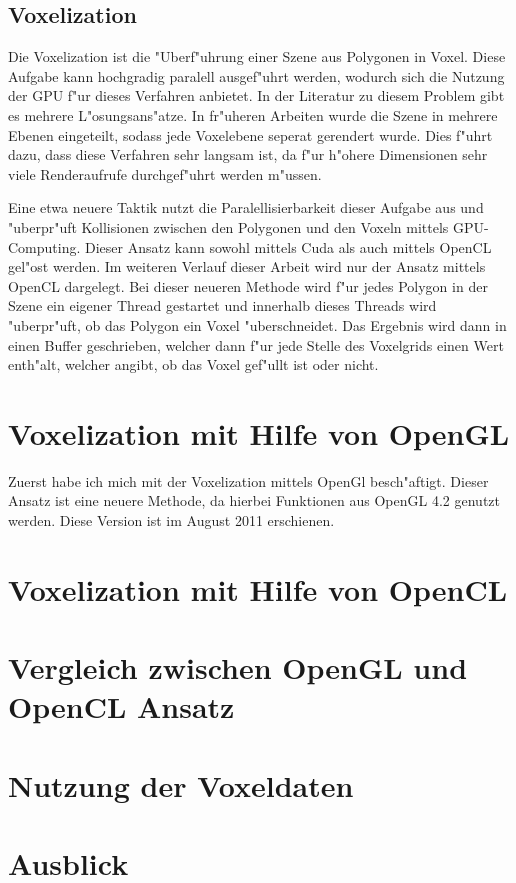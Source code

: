 \documentclass[a4paper, 12pt]{scrartcl}
\begin{document}
\subsection{Voxelization}
Die Voxelization ist die "Uberf"uhrung einer Szene aus Polygonen in Voxel. Diese Aufgabe kann hochgradig paralell ausgef"uhrt werden, wodurch sich die Nutzung der GPU f"ur dieses Verfahren anbietet. In der Literatur zu diesem Problem gibt es mehrere L"osungsans"atze. In fr"uheren Arbeiten wurde die Szene in mehrere Ebenen eingeteilt, sodass jede Voxelebene seperat gerendert wurde. Dies f"uhrt dazu, dass diese Verfahren sehr langsam ist, da f"ur h"ohere Dimensionen sehr viele Renderaufrufe durchgef"uhrt werden m"ussen.

Eine etwa neuere Taktik nutzt die Paralellisierbarkeit dieser Aufgabe aus und "uberpr"uft Kollisionen zwischen den Polygonen und den Voxeln mittels GPU-Computing. Dieser Ansatz kann sowohl mittels Cuda als auch mittels OpenCL gel"ost werden. Im weiteren Verlauf dieser Arbeit wird nur der Ansatz mittels OpenCL dargelegt.
Bei dieser neueren Methode wird f"ur jedes Polygon in der Szene ein eigener Thread gestartet und innerhalb dieses Threads wird "uberpr"uft, ob das Polygon ein Voxel "uberschneidet. Das Ergebnis wird dann in einen Buffer geschrieben, welcher dann f"ur jede Stelle des Voxelgrids einen Wert enth"alt, welcher angibt, ob das Voxel gef"ullt ist oder nicht.

\section{Voxelization mit Hilfe von OpenGL}
Zuerst habe ich mich mit der Voxelization mittels OpenGl besch"aftigt. Dieser Ansatz ist eine neuere Methode, da hierbei Funktionen aus OpenGL 4.2 genutzt werden. Diese Version ist im August 2011 erschienen.



\section{Voxelization mit Hilfe von OpenCL}

\section{Vergleich zwischen OpenGL und OpenCL Ansatz}

\section{Nutzung der Voxeldaten}

\section{Ausblick}
\end{document}
